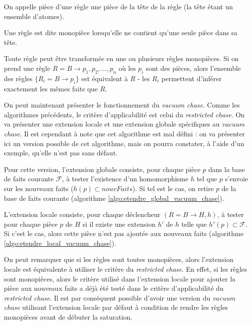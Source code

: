 \begin{definition}\label{def:piece_regle}
    On appelle pièce d’une règle une pièce de la tête de la règle (la tête étant un ensemble d'atomes).
    \par Une règle est dite monopièce lorsqu'elle ne contient qu'une seule pièce dans sa tête.
    \par Toute règle peut être transformée en une ou plusieurs règles monopièces. Si on prend une règle $R = B \rightarrow p_1, p_2, \ldots, p_n$ où les $p_i$ sont des pièces, alors l'ensemble des règles $\{R_i = B \rightarrow p_i\}$ est équivalent à $R$ - les $R_i$ permettent d'inférer exactement les mêmes faits que $R$.
\end{definition}
\par On peut maintenant présenter le fonctionnement du \textit{vacuum chase}. Comme les algorithmes précédents, le critère d'applicabilité est celui du \textit{restricted chase}. On va présenter une extension locale et une extension globale spécifiques au \textit{vacuum chase}. Il est cependant à note que cet algorithme est mal défini : on va présenter ici un version possible de cet algorithme, mais on pourra constater, à l'aide d'un exemple, qu'elle n'est pas sans défaut.
\par Pour cette version, l'extension globale consiste, pour chaque pièce $p$ dans la base de faits courante $\mathcal{F}$, à tester l'existence d'un homomorphisme $h$ tel que $p$ s'envoie sur les nouveaux faits ($h(p) \subset nouvFaits$). Si tel est le cas, on retire $p$ de la base de faits courante (algorithme \ref{algo:etendre_global_vacuum_chase}).
\par L'extension locale consiste, pour chaque déclencheur $(R = B \rightarrow H,h)$, à tester pour chaque pièce $p$ de $H$ si il existe une extension $h'$ de $h$ telle que $h'(p) \subset \mathcal{F}$. Si c'est le cas, alors cette pièce n'est pas ajoutée aux nouveaux faits (algorithme \ref{algo:etendre_local_vacuum_chase}). 
\par On peut remarquer que si les règles sont toutes monopièces, alors l'extension locale est équivalente à utiliser le critère du \textit{restricted chase}. En effet, si les règles sont monopièces, alors le critère utilisé dans l'extension locale pour ajouter la pièce aux nouveaux faits a déjà été testé dans le critère d'applicabilité du \textit{restricted chase}. Il est par conséquent possible d'avoir une version du \textit{vacuum chase} utilisant l'extension locale par défaut à condition de rendre les règles monopièces avant de débuter la saturation.\pagebreak

